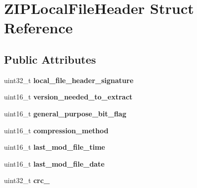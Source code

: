 \hypertarget{structZIPLocalFileHeader}{\section{Z\-I\-P\-Local\-File\-Header Struct Reference}
\label{structZIPLocalFileHeader}
}
\subsection*{Public Attributes}
\begin{DoxyCompactItemize}
\item 
\hypertarget{structZIPLocalFileHeader_a009e2235a7d706f6629e2aad14bd1e33}{uint32\-\_\-t {\bfseries local\-\_\-file\-\_\-header\-\_\-signature}}\label{structZIPLocalFileHeader_a009e2235a7d706f6629e2aad14bd1e33}

\item 
\hypertarget{structZIPLocalFileHeader_a85f01009a062fbc74e2f0e6a5308cefc}{uint16\-\_\-t {\bfseries version\-\_\-needed\-\_\-to\-\_\-extract}}\label{structZIPLocalFileHeader_a85f01009a062fbc74e2f0e6a5308cefc}

\item 
\hypertarget{structZIPLocalFileHeader_ac8e0ae7ac951aabd6dd0fdb2ced54cc1}{uint16\-\_\-t {\bfseries general\-\_\-purpose\-\_\-bit\-\_\-flag}}\label{structZIPLocalFileHeader_ac8e0ae7ac951aabd6dd0fdb2ced54cc1}

\item 
\hypertarget{structZIPLocalFileHeader_a5ea57585773dc8212a522bdeb4888710}{uint16\-\_\-t {\bfseries compression\-\_\-method}}\label{structZIPLocalFileHeader_a5ea57585773dc8212a522bdeb4888710}

\item 
\hypertarget{structZIPLocalFileHeader_a14eec0f2566ec1f933e2c76135987703}{uint16\-\_\-t {\bfseries last\-\_\-mod\-\_\-file\-\_\-time}}\label{structZIPLocalFileHeader_a14eec0f2566ec1f933e2c76135987703}

\item 
\hypertarget{structZIPLocalFileHeader_a3ff3537a43ab7c06a4f8eea89234c262}{uint16\-\_\-t {\bfseries last\-\_\-mod\-\_\-file\-\_\-date}}\label{structZIPLocalFileHeader_a3ff3537a43ab7c06a4f8eea89234c262}

\item 
\hypertarget{structZIPLocalFileHeader_a23ced3896e9e53cfecf9e48b2c1eca2a}{uint32\-\_\-t {\bfseries crc\-\_}}\label{structZIPLocalFileHeader_a23ced3896e9e53cfecf9e48b2c1eca2a}


\end{DoxyCompactItemize}
